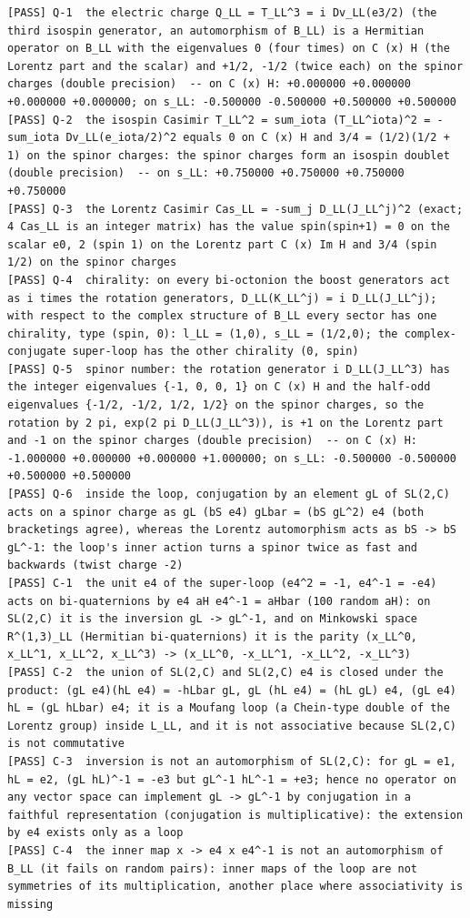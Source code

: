 \documentclass[
  10pt,
]{article}
\begin{document}
\begin{verbatim}
[PASS] Q-1  the electric charge Q_LL = T_LL^3 = i Dv_LL(e3/2) (the third isospin generator, an automorphism of B_LL) is a Hermitian operator on B_LL with the eigenvalues 0 (four times) on C (x) H (the Lorentz part and the scalar) and +1/2, -1/2 (twice each) on the spinor charges (double precision)  -- on C (x) H: +0.000000 +0.000000 +0.000000 +0.000000; on s_LL: -0.500000 -0.500000 +0.500000 +0.500000
[PASS] Q-2  the isospin Casimir T_LL^2 = sum_iota (T_LL^iota)^2 = -sum_iota Dv_LL(e_iota/2)^2 equals 0 on C (x) H and 3/4 = (1/2)(1/2 + 1) on the spinor charges: the spinor charges form an isospin doublet (double precision)  -- on s_LL: +0.750000 +0.750000 +0.750000 +0.750000
[PASS] Q-3  the Lorentz Casimir Cas_LL = -sum_j D_LL(J_LL^j)^2 (exact; 4 Cas_LL is an integer matrix) has the value spin(spin+1) = 0 on the scalar e0, 2 (spin 1) on the Lorentz part C (x) Im H and 3/4 (spin 1/2) on the spinor charges
[PASS] Q-4  chirality: on every bi-octonion the boost generators act as i times the rotation generators, D_LL(K_LL^j) = i D_LL(J_LL^j); with respect to the complex structure of B_LL every sector has one chirality, type (spin, 0): l_LL = (1,0), s_LL = (1/2,0); the complex-conjugate super-loop has the other chirality (0, spin)
[PASS] Q-5  spinor number: the rotation generator i D_LL(J_LL^3) has the integer eigenvalues {-1, 0, 0, 1} on C (x) H and the half-odd eigenvalues {-1/2, -1/2, 1/2, 1/2} on the spinor charges, so the rotation by 2 pi, exp(2 pi D_LL(J_LL^3)), is +1 on the Lorentz part and -1 on the spinor charges (double precision)  -- on C (x) H: -1.000000 +0.000000 +0.000000 +1.000000; on s_LL: -0.500000 -0.500000 +0.500000 +0.500000
[PASS] Q-6  inside the loop, conjugation by an element gL of SL(2,C) acts on a spinor charge as gL (bS e4) gLbar = (bS gL^2) e4 (both bracketings agree), whereas the Lorentz automorphism acts as bS -> bS gL^-1: the loop's inner action turns a spinor twice as fast and backwards (twist charge -2)
[PASS] C-1  the unit e4 of the super-loop (e4^2 = -1, e4^-1 = -e4) acts on bi-quaternions by e4 aH e4^-1 = aHbar (100 random aH): on SL(2,C) it is the inversion gL -> gL^-1, and on Minkowski space R^(1,3)_LL (Hermitian bi-quaternions) it is the parity (x_LL^0, x_LL^1, x_LL^2, x_LL^3) -> (x_LL^0, -x_LL^1, -x_LL^2, -x_LL^3)
[PASS] C-2  the union of SL(2,C) and SL(2,C) e4 is closed under the product: (gL e4)(hL e4) = -hLbar gL, gL (hL e4) = (hL gL) e4, (gL e4) hL = (gL hLbar) e4; it is a Moufang loop (a Chein-type double of the Lorentz group) inside L_LL, and it is not associative because SL(2,C) is not commutative
[PASS] C-3  inversion is not an automorphism of SL(2,C): for gL = e1, hL = e2, (gL hL)^-1 = -e3 but gL^-1 hL^-1 = +e3; hence no operator on any vector space can implement gL -> gL^-1 by conjugation in a faithful representation (conjugation is multiplicative): the extension by e4 exists only as a loop
[PASS] C-4  the inner map x -> e4 x e4^-1 is not an automorphism of B_LL (it fails on random pairs): inner maps of the loop are not symmetries of its multiplication, another place where associativity is missing
\end{verbatim}
\end{document}
